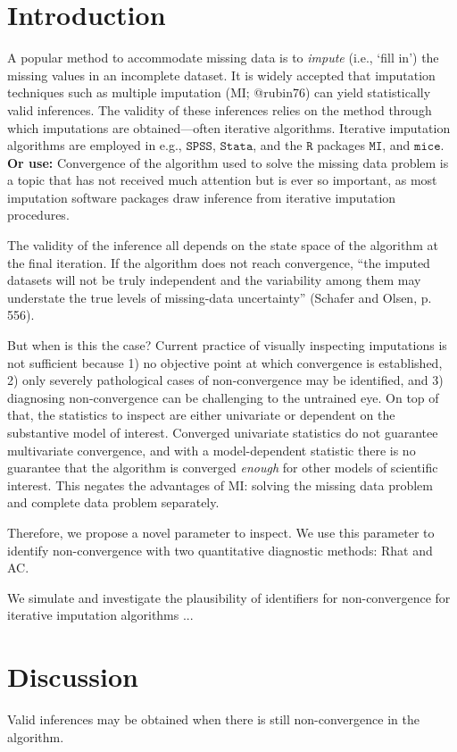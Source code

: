 \documentclass{article}
\begin{document}
\section{Introduction}
\label{intro}

A popular method to accommodate missing data is to \textit{impute} (i.e., `fill in') the missing values in an incomplete dataset. It is widely accepted that imputation techniques such as multiple imputation (MI; @rubin76) can yield statistically valid inferences. The validity of these inferences relies on the method through which imputations are obtained---often iterative algorithms. Iterative imputation algorithms are employed in e.g., $\mathtt{SPSS}$, $\mathtt{Stata}$, and the $\mathtt{R}$ packages $\mathtt{MI}$, and $\mathtt{mice}$. \textbf{Or use:} Convergence of the algorithm used to solve the missing data problem is a topic that has not received much attention but is ever so important, as most imputation software packages draw inference from iterative imputation procedures.

The validity of the inference all depends on the state space of the algorithm at the final iteration. If the algorithm does not reach convergence, ``the imputed datasets will not be truly independent and the variability among them may understate the true levels of missing-data uncertainty'' (Schafer and Olsen, p. 556). 

But when is this the case? Current practice of visually inspecting imputations is not sufficient because 1) no objective point at which convergence is established, 2) only severely pathological cases of non-convergence may be identified, and 3) diagnosing non-convergence can be challenging to the untrained eye. On top of that, the statistics to inspect are either univariate or dependent on the substantive model of interest. Converged univariate statistics do not guarantee multivariate convergence, and with a model-dependent statistic there is no guarantee that the algorithm is converged \textit{enough} for other models of scientific interest. This negates the advantages of MI: solving the missing data problem and complete data problem separately.

Therefore, we propose a novel parameter to inspect. We use this parameter to identify non-convergence with two quantitative diagnostic methods: Rhat and AC. 

We simulate and investigate the plausibility of identifiers for non-convergence for iterative imputation algorithms ...

\section{Discussion}
\label{discussion}

Valid inferences may be obtained when there is still non-convergence in the algorithm.







\end{document}
